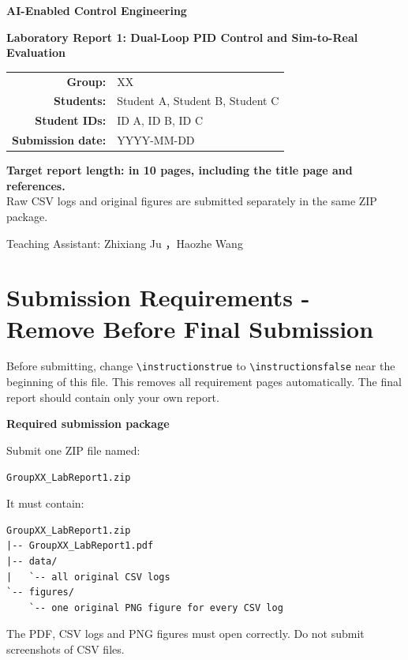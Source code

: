 \documentclass[11pt,a4paper]{article}
\newcommand{\CourseName}{AI-Enabled Control Engineering}
\newcommand{\ReportTitle}{Laboratory Report 1: Dual-Loop PID Control and Sim-to-Real Evaluation}
\newcommand{\GroupNumber}{XX}
\newcommand{\StudentNames}{Student A, Student B, Student C}
\newcommand{\StudentIDs}{ID A, ID B, ID C}
\newcommand{\SubmissionDate}{YYYY-MM-DD}
\newif\ifinstructions
\begin{document}
\begin{titlepage}
\centering
\vspace*{15mm}
{\Large\bfseries \CourseName\par}
\vspace{13mm}
{\huge\bfseries\color{TAblue} \ReportTitle\par}
\vspace{18mm}
\begin{tabular}{>{\bfseries}rl}
Group: & \GroupNumber\\[2mm]
Students: & \StudentNames\\[2mm]
Student IDs: & \StudentIDs\\[2mm]
Submission date: & \SubmissionDate
\end{tabular}
\vfill
\begin{tcolorbox}[width=0.84\linewidth,colback=TAgray,colframe=TAblue]
\centering
\textbf{Target report length: in 10 pages, including the title page and references.}\\
Raw CSV logs and original figures are submitted separately in the same ZIP package.
\end{tcolorbox}
\vspace{8mm}
{\small Teaching Assistant: Zhixiang Ju ，Haozhe Wang}
\end{titlepage}

\ifinstructions
\section*{Submission Requirements - Remove Before Final Submission}

\begin{warningbox}
Before submitting, change \verb|\instructionstrue| to \verb|\instructionsfalse| near the beginning of this file. This removes all requirement pages automatically. The final report should contain only your own report.
\end{warningbox}

\begin{requirementbox}
\textbf{Required submission package}

Submit one ZIP file named:
\begin{center}
\texttt{GroupXX\_LabReport1.zip}
\end{center}
It must contain:
\begin{verbatim}
GroupXX_LabReport1.zip
|-- GroupXX_LabReport1.pdf
|-- data/
|   `-- all original CSV logs
`-- figures/
    `-- one original PNG figure for every CSV log
\end{verbatim}
The PDF, CSV logs and PNG figures must open correctly. Do not submit screenshots of CSV files.
\end{requirementbox}
\end{document}
